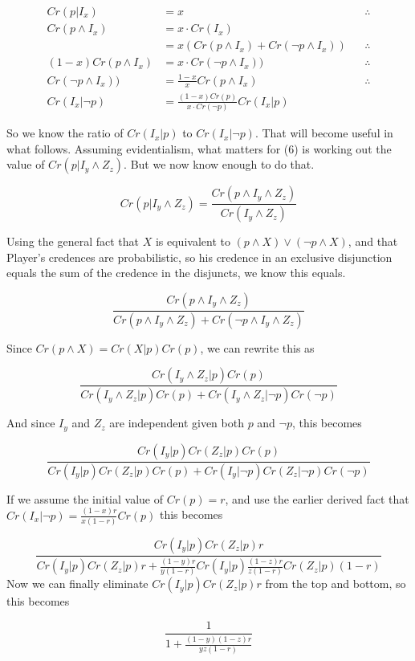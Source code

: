 \documentclass[
  12pt,
]{article}
\begin{document}
\begin{align*}
Cr(p | I_x) &= x &&\therefore \\
Cr(p \wedge I_x) &= x \cdot Cr(I_x) \\
 &= x (Cr(p \wedge I_x) + Cr(\neg p \wedge I_x)) &&\therefore \\
(1-x)Cr(p \wedge I_x) &= x \cdot Cr(\neg p \wedge I_x)) &&\therefore \\
Cr(\neg p \wedge I_x)) &= \frac{1-x}{x} Cr(p \wedge I_x) &&\therefore \\
Cr(I_x | \neg p) &= \frac{(1-x)Cr(p)}{x\cdot Cr(\neg p)}Cr(I_x | p)
\end{align*}

So we know the ratio of \(Cr(I_x | p)\) to \(Cr(I_x | \neg p)\). That
will become useful in what follows. Assuming evidentialism, what matters
for (6) is working out the value of \(Cr(p | I_y \wedge Z_z)\). But we
now know enough to do that.

\[
Cr(p | I_y \wedge Z_z) = \frac{Cr(p \wedge I_y \wedge Z_z)}{Cr(I_y \wedge Z_z)}
\]

Using the general fact that \(X\) is equivalent to
\((p \wedge X) \vee (\neg p \wedge X)\), and that Player's credences are
probabilistic, so his credence in an exclusive disjunction equals the
sum of the credence in the disjuncts, we know this equals.

\[
\frac{Cr(p \wedge I_y \wedge Z_z)}{Cr(p \wedge I_y \wedge Z_z) + Cr(\neg p \wedge I_y \wedge Z_z)}
\]

Since \(Cr(p \wedge X) = Cr(X | p)Cr(p)\), we can rewrite this as

\[
\frac{Cr(I_y \wedge Z_z | p) Cr(p)}{Cr(I_y \wedge Z_z | p)Cr(p) + Cr(I_y \wedge Z_z | \neg p)Cr(\neg p)}
\]

And since \(I_y\) and \(Z_z\) are independent given both \(p\) and
\(\neg p\), this becomes

\[
\frac{Cr(I_y| p) Cr(Z_z | p) Cr(p)}{Cr(I_y| p) Cr(Z_z | p) Cr(p) + Cr(I_y| \neg p) Cr(Z_z | \neg p) Cr(\neg p)}
\]

If we assume the initial value of \(Cr(p) = r\), and use the earlier
derived fact that \(Cr(I_x | \neg p) = \frac{(1-x)r}{x(1-r)}Cr(p)\) this
becomes

\[
\frac{Cr(I_y| p) Cr(Z_z | p)r}{Cr(I_y| p) Cr(Z_z | p)r + \frac{(1-y)r}{y(1-r)} Cr(I_y| p) \frac{(1-z)r}{z(1-r)} Cr(Z_z | p) (1-r)}
\] Now we can finally eliminate \(Cr(I_y| p) Cr(Z_z | p)r\) from the top
and bottom, so this becomes

\[
\frac{1}{1 + \frac{(1-y)(1-z)r}{yz(1-r)}}
\]
\end{document}
